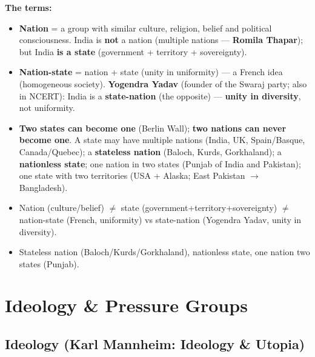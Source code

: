 \begin{KeyConcept}
\textbf{The terms:}
\begin{itemize}
\item \textbf{Nation} = a group with similar culture, religion, belief and political consciousness. India is \textbf{not} a nation (multiple nations --- \textbf{Romila Thapar}); but India \textbf{is a state} (government + territory + sovereignty).
\item \textbf{Nation-state} = nation + state (unity in uniformity) --- a French idea (homogeneous society). \textbf{Yogendra Yadav} (founder of the Swaraj party; also in NCERT): India is a \textbf{state-nation} (the opposite) --- \textbf{unity in diversity}, not uniformity.
\item \textbf{Two states can become one} (Berlin Wall); \textbf{two nations can never become one}. A state may have multiple nations (India, UK, Spain/Basque, Canada/Quebec); a \textbf{stateless nation} (Baloch, Kurds, Gorkhaland); a \textbf{nationless state}; one nation in two states (Punjab of India and Pakistan); one state with two territories (USA + Alaska; East Pakistan $\rightarrow$ Bangladesh).
\end{itemize}
\end{KeyConcept}

\begin{QuickRevision}
\begin{itemize}
\item Nation (culture/belief) $\neq$ state (government+territory+sovereignty) $\neq$ nation-state (French, uniformity) vs state-nation (Yogendra Yadav, unity in diversity).
\item Stateless nation (Baloch/Kurds/Gorkhaland), nationless state, one nation two states (Punjab).
\end{itemize}
\end{QuickRevision}

\sectiondivider

\section{Ideology \& Pressure Groups}

\subsection{Ideology (Karl Mannheim: Ideology \& Utopia)}

